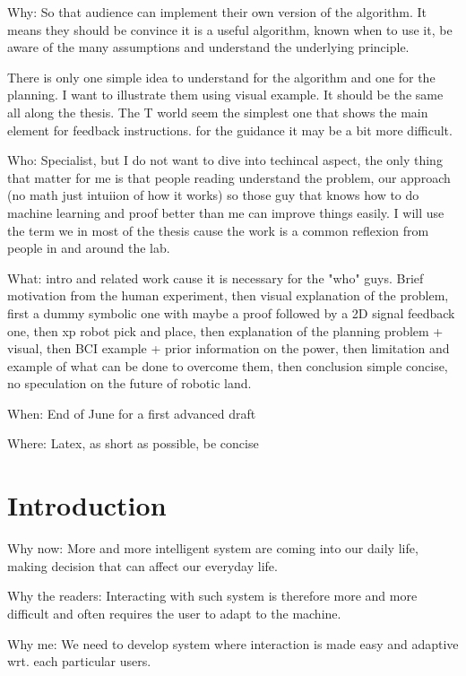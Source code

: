 
Why: So that audience can implement their own version of the algorithm. It means they should be convince it is a useful algorithm, known when to use it, be aware of the many assumptions and understand the underlying principle. 

There is only one simple idea to understand for the algorithm and one for the planning. I want to illustrate them using visual example. It should be the same all along the thesis. The T world seem the simplest one that shows the main element for feedback instructions. for the guidance it may be a bit more difficult.

Who: Specialist, but I do not want to dive into techincal aspect, the only thing that matter for me is that people reading understand the problem, our approach (no math just intuiion of how it works) so those guy that knows how to do machine learning and proof better than me can improve things easily. I will use the term we in most of the thesis cause the work is a common reflexion from people in and around the lab.

What: intro and related work cause it is necessary for the "who" guys. Brief motivation from the human experiment, then visual explanation of the problem, first a dummy symbolic one with maybe a proof followed by a 2D signal feedback one, then xp robot pick and place, then explanation of the planning problem + visual, then BCI example + prior information on the power, then limitation and example of what can be done to overcome them, then conclusion simple concise, no speculation on the future of robotic land.

When: End of June for a first advanced draft

Where: Latex, as short as possible, be concise

\chapter{Introduction}
\minitoc

Why now: More and more intelligent system are coming into our daily life, making decision that can affect our everyday life.

Why the readers: Interacting with such system is therefore more and more difficult and often requires the user to adapt to the machine.

Why me: We need to develop system where interaction is made easy and adaptive wrt. each particular users. 


